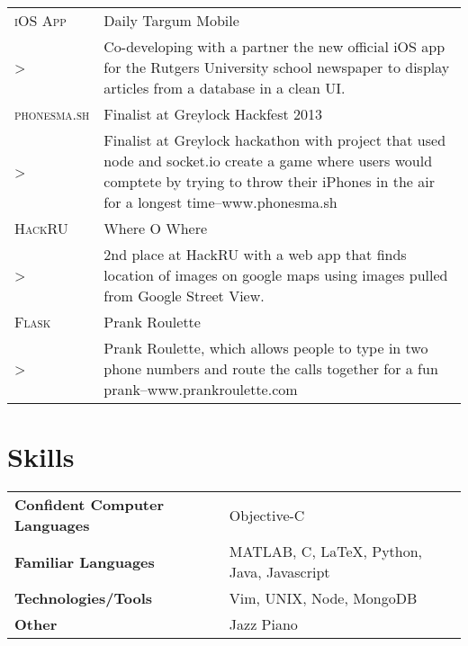 \documentclass[a4paper, oneside, final]{scrartcl} %
\newcommand{\gray}{\rowcolor[gray]{.90}} %
\begin{document}
\begin{center}
\begin{tabularx}{0.97\linewidth}{>{\raggedleft\scshape}p{2.0cm}X}
    \gray iOS App & Daily Targum Mobile\\
  >& Co-developing with a partner the new official iOS app for the Rutgers University school newspaper to display articles from a database in a clean UI. \\
    \gray phonesma.sh & Finalist at Greylock Hackfest 2013\\
  >& Finalist at Greylock hackathon with project that used node and socket.io create a game where users would comptete by trying to throw their iPhones in the air for a longest time--www.phonesma.sh\\
    \gray HackRU & Where O Where \\
  >& 2nd place at HackRU with a web app that finds location of images on google maps using images pulled from Google Street View. \\
    \gray Flask  & Prank Roulette\\
  >& Prank Roulette, which allows people to type in two phone numbers and route the calls together for a fun prank--www.prankroulette.com \\
\end{tabularx}



\section{Skills}

\begin{tabular}{@{} >{\bfseries}l @{\hspace{4ex}} l }
Confident Computer Languages & Objective-C\\
Familiar Languages & MATLAB, C, \LaTeX, Python, Java, Javascript  \\
Technologies/Tools & Vim, UNIX, Node, MongoDB \\
Other & Jazz Piano
\end{tabular}


\end{center}
\end{document}
